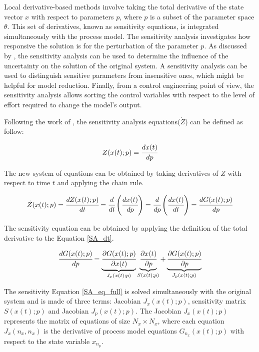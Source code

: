 \documentclass[../Article_Sensitivity_Analsysis.tex]{subfiles}
\begin{document}
	
	Local derivative-based methods involve taking the total derivative of the state vector $x$ with respect to parameters $p$, where $p$ is a subset of the parameter space $\theta$. This set of derivatives, known as sensitivity equations, is integrated simultaneously with the process model. The sensitivity analysis investigates how responsive the solution is for the perturbation of the parameter $p$. As discussed by \citet{Dickinson1976}, the sensitivity analysis can be used to determine the influence of the uncertainty on the solution of the original system. A sensitivity analysis can be used to distinguish sensitive parameters from insensitive ones, which might be helpful for model reduction. Finally, from a control engineering point of view, the sensitivity analysis allows sorting the control variables with respect to the level of effort required to change the model's output.
	
	Following the work of \citet{Maly1996}, the sensitivity analysis equations(${\dot{Z}}$) can be defined as follow:
	
	{\footnotesize
		\begin{equation}
			\label{SA_def}
			Z(x(t);p) = \cfrac{dx(t)}{dp}
	   \end{equation} }
	
	The new system of equations can be obtained by taking derivatives of $Z$ with respect to time $t$ and applying the chain rule.
	
	{\footnotesize
		\begin{equation} \label{SA_dt} 
			{\dot{Z}}(x(t);p)  = \cfrac{dZ(x(t);p)}{d t} = \cfrac{d}{d t} \left( \cfrac{dx(t)}{dp} \right) = \cfrac{d }{dp} \left( \cfrac{dx(t)}{d t} \right) = \cfrac{d {G}(x(t);p)}{dp} 
	\end{equation} }
	
	The sensitivity equation can be obtained by applying the definition of the total derivative to the Equation \ref{SA_dt}.
	
	{\footnotesize
		\begin{equation} \label{SA_eq_full}
			\cfrac{dG(x(t);p)}{dp} = \underbrace{ \cfrac{\partial {G}(x(t);p)}{\partial x(t)} }_{{J_x}(x(t);p)} \underbrace{\cfrac{\partial x(t)}{\partial p} }_{S(x(t);p)} + \underbrace{ \cfrac{\partial {G}(x(t);p)}{\partial p} }_{{J_p}(x(t);p)}
	  \end{equation} }
	
	The sensitivity Equation \ref{SA_eq_full} is solved simultaneously with the original system and is made of three terms: Jacobian ${J_x}(x(t);p)$, sensitivity matrix $S(x(t);p)$ and Jacobian ${J_p}(x(t);p)$. The Jacobian ${J_x}(x(t);p)$ represents the matrix of equations of size $N_x \times N_x$, where each equation ${J_x}(n_x,n_x)$ is the derivative of process model equations ${G}_{n_x}(x(t);p)$ with respect to the state variable $x_{n_p}$.
	
\end{document}
